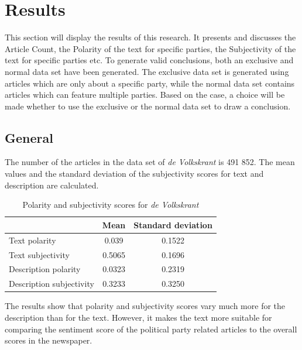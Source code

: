 \section{Results}
This section will display the results of this research. It presents and discusses the Article Count, the Polarity of the text for specific parties, the Subjectivity of the text for specific parties etc. To generate valid conclusions, both an exclusive and normal data set have been generated. The exclusive data set is generated using articles which are only about a specific party, while the normal data set contains articles which can feature multiple parties. Based on the case, a choice will be made whether to use the exclusive or the normal data set to draw a conclusion.

\subsection{General}
The number of the articles in the data set of {\it de Volkskrant} is 491 852. The mean values and the standard deviation of the subjectivity scores for text and description are calculated. \\
\begin{table}[h]
  \begin{tabular}{ l | c | c }
  &Mean&Standard deviation\\
  \hline
  Text polarity&0.039&0.1522\\
  Text subjectivity&0.5065&0.1696\\
  Description polarity&0.0323&0.2319\\
  Description subjectivity&0.3233&0.3250\\
  \end{tabular}
  \caption{Polarity and subjectivity scores for {\it de Volkskrant}}
  \label{tab:general}
\end{table}
The results show that polarity and subjectivity scores vary much more for the description than for the text. However, it makes the text more suitable for comparing the sentiment score of the political party related articles to the overall scores in the newspaper.

